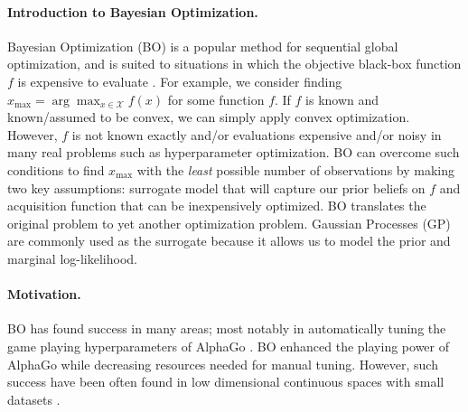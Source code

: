 \documentclass[
    american,a4paper
    ]{scrartcl}
\newcommand{\xmax}{x_{\max}}
\begin{document}
        \paragraph{Introduction to Bayesian Optimization.}
        Bayesian Optimization (BO) is a popular method for sequential global optimization, and is suited to situations in which the objective black-box function $f$ is expensive to evaluate \cite{snoek2012practical,mockus1994application}. 
        For example, we consider finding $\xmax = \arg \max_{x \in {\mathcal X}} f(x)$ for some function $f$.
        If $f$ is known and known/assumed to be convex, we can simply apply convex optimization. 
        However, $f$ is not known exactly and/or evaluations expensive and/or noisy in many real problems such as hyperparameter optimization.
        BO can overcome such conditions to find $\xmax$ with the \textit{least} possible number of observations by making two key assumptions:
        surrogate model that will capture our prior beliefs on $f$ and acquisition function that can be inexpensively optimized.
        BO translates the original problem to yet another optimization problem.
        Gaussian Processes (GP) are commonly used as the surrogate because it allows us to model the prior and marginal log-likelihood.
        \paragraph{Motivation.}
        BO has found success in many areas; 
        most notably in automatically tuning the game playing hyperparameters of AlphaGo \cite{chen2018bayesian}.
        BO enhanced the playing power of AlphaGo while decreasing resources needed for manual tuning.
        However, such success have been often found in low dimensional \cite{wang2013bayesian} continuous spaces \cite{7352306} with small datasets \cite{ambikasaran2015fast}.
\end{document}

